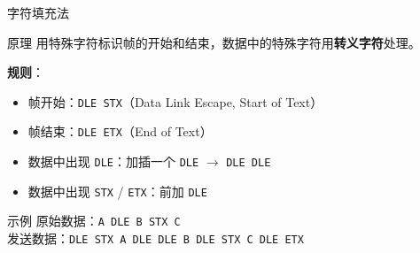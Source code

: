 \documentclass[10pt, aspectratio=169]{beamer}
\begin{document}
\begin{frame}{字符填充法}
    \begin{block}{原理}
        用特殊字符标识帧的开始和结束，数据中的特殊字符用\textbf{转义字符}处理。
    \end{block}
    \vspace{0.3em}
    \begin{center}
    \end{center}
    \vspace{0.3em}
    \textbf{规则}：
    \begin{itemize}
        \item 帧开始：\texttt{DLE STX}（Data Link Escape, Start of Text）
        \item 帧结束：\texttt{DLE ETX}（End of Text）
        \item 数据中出现 \texttt{DLE}：加插一个 \texttt{DLE} $\to$ \texttt{DLE DLE}
        \item 数据中出现 \texttt{STX} / \texttt{ETX}：前加 \texttt{DLE}
    \end{itemize}
    \vspace{0.3em}
    \begin{exampleblock}{示例}
        原始数据：\texttt{A DLE B STX C}\\
        发送数据：\texttt{DLE STX A DLE DLE B DLE STX C DLE ETX}
    \end{exampleblock}
\end{frame}
\end{document}
